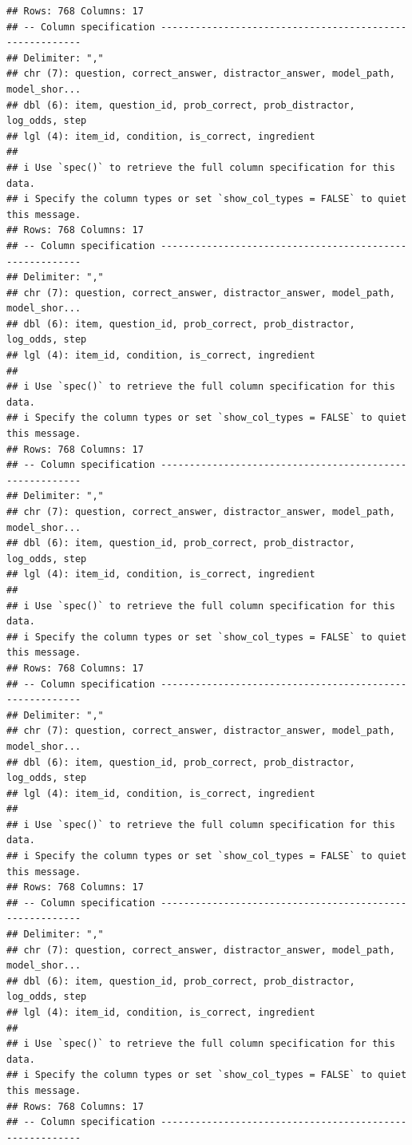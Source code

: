 \documentclass[
]{article}
\begin{document}
\begin{verbatim}
## Rows: 768 Columns: 17
## -- Column specification --------------------------------------------------------
## Delimiter: ","
## chr (7): question, correct_answer, distractor_answer, model_path, model_shor...
## dbl (6): item, question_id, prob_correct, prob_distractor, log_odds, step
## lgl (4): item_id, condition, is_correct, ingredient
## 
## i Use `spec()` to retrieve the full column specification for this data.
## i Specify the column types or set `show_col_types = FALSE` to quiet this message.
## Rows: 768 Columns: 17
## -- Column specification --------------------------------------------------------
## Delimiter: ","
## chr (7): question, correct_answer, distractor_answer, model_path, model_shor...
## dbl (6): item, question_id, prob_correct, prob_distractor, log_odds, step
## lgl (4): item_id, condition, is_correct, ingredient
## 
## i Use `spec()` to retrieve the full column specification for this data.
## i Specify the column types or set `show_col_types = FALSE` to quiet this message.
## Rows: 768 Columns: 17
## -- Column specification --------------------------------------------------------
## Delimiter: ","
## chr (7): question, correct_answer, distractor_answer, model_path, model_shor...
## dbl (6): item, question_id, prob_correct, prob_distractor, log_odds, step
## lgl (4): item_id, condition, is_correct, ingredient
## 
## i Use `spec()` to retrieve the full column specification for this data.
## i Specify the column types or set `show_col_types = FALSE` to quiet this message.
## Rows: 768 Columns: 17
## -- Column specification --------------------------------------------------------
## Delimiter: ","
## chr (7): question, correct_answer, distractor_answer, model_path, model_shor...
## dbl (6): item, question_id, prob_correct, prob_distractor, log_odds, step
## lgl (4): item_id, condition, is_correct, ingredient
## 
## i Use `spec()` to retrieve the full column specification for this data.
## i Specify the column types or set `show_col_types = FALSE` to quiet this message.
## Rows: 768 Columns: 17
## -- Column specification --------------------------------------------------------
## Delimiter: ","
## chr (7): question, correct_answer, distractor_answer, model_path, model_shor...
## dbl (6): item, question_id, prob_correct, prob_distractor, log_odds, step
## lgl (4): item_id, condition, is_correct, ingredient
## 
## i Use `spec()` to retrieve the full column specification for this data.
## i Specify the column types or set `show_col_types = FALSE` to quiet this message.
## Rows: 768 Columns: 17
## -- Column specification --------------------------------------------------------

\end{verbatim}
\end{document}
